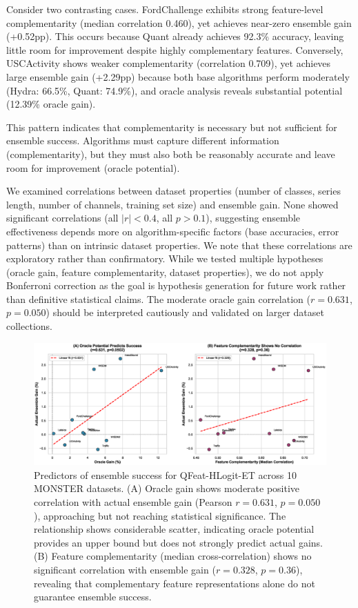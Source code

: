\documentclass[pdflatex,sn-basic]{sn-jnl}           %
\theoremstyle{thmstyleone}%
\theoremstyle{thmstyletwo}%
\theoremstyle{thmstylethree}%
\begin{document}
Consider two contrasting cases. FordChallenge exhibits strong feature-level complementarity (median correlation 0.460), yet achieves near-zero ensemble gain (+0.52pp). This occurs because Quant already achieves 92.3\% accuracy, leaving little room for improvement despite highly complementary features. Conversely, USCActivity shows weaker complementarity (correlation 0.709), yet achieves large ensemble gain (+2.29pp) because both base algorithms perform moderately (Hydra: 66.5\%, Quant: 74.9\%), and oracle analysis reveals substantial potential (12.39\% oracle gain).

This pattern indicates that complementarity is necessary but not sufficient for ensemble success. Algorithms must capture different information (complementarity), but they must also both be reasonably accurate and leave room for improvement (oracle potential).

We examined correlations between dataset properties (number of classes, series length, number of channels, training set size) and ensemble gain. None showed significant correlations (all $|r| < 0.4$, all $p > 0.1$), suggesting ensemble effectiveness depends more on algorithm-specific factors (base accuracies, error patterns) than on intrinsic dataset properties. We note that these correlations are exploratory rather than confirmatory. While we tested multiple hypotheses (oracle gain, feature complementarity, dataset properties), we do not apply Bonferroni correction as the goal is hypothesis generation for future work rather than definitive statistical claims. The moderate oracle gain correlation ($r=0.631$, $p=0.050$) should be interpreted cautiously and validated on larger dataset collections.

\begin{figure}[tb]
\centering
\includegraphics[width=\textwidth]{figure3_predictors}
\caption{Predictors of ensemble success for QFeat-HLogit-ET across 10 MONSTER datasets. (A) Oracle gain shows moderate positive correlation with actual ensemble gain (Pearson $r=0.631$, $p=0.050$), approaching but not reaching statistical significance. The relationship shows considerable scatter, indicating oracle potential provides an upper bound but does not strongly predict actual gains. (B) Feature complementarity (median cross-correlation) shows no significant correlation with ensemble gain ($r=0.328$, $p=0.36$), revealing that complementary feature representations alone do not guarantee ensemble success.}\label{fig:predictors}
\end{figure}
\end{document}

